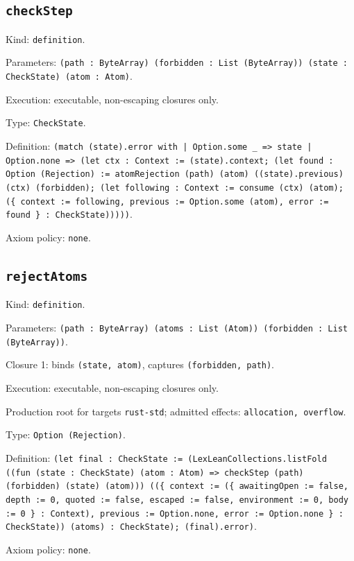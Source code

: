 \documentclass[11pt]{article}
\begin{document}
\subsection*{\texttt{checkStep}}
\noindent Kind: \texttt{definition}.\par
\noindent Parameters: \texttt{(path : ByteArray) (forbidden : List (ByteArray)) (state : CheckState) (atom : Atom)}.\par
\noindent Execution: executable, non-escaping closures only.\par
\noindent Type: \texttt{CheckState}.\par
\noindent Definition: \texttt{(match (state).error with | Option.some \_ => state | Option.none => (let ctx : Context := (state).context; (let found : Option (Rejection) := atomRejection (path) (atom) ((state).previous) (ctx) (forbidden); (let following : Context := consume (ctx) (atom); (\{ context := following, previous := Option.some (atom), error := found \} : CheckState)))))}.\par
\noindent Axiom policy: \texttt{none}.\par
\subsection*{\texttt{rejectAtoms}}
\noindent Kind: \texttt{definition}.\par
\noindent Parameters: \texttt{(path : ByteArray) (atoms : List (Atom)) (forbidden : List (ByteArray))}.\par
\noindent Closure 1: binds \texttt{(state, atom)}, captures \texttt{(forbidden, path)}.\par
\noindent Execution: executable, non-escaping closures only.\par
\noindent Production root for targets \texttt{rust-std}; admitted effects: \texttt{allocation, overflow}.\par
\noindent Type: \texttt{Option (Rejection)}.\par
\noindent Definition: \texttt{(let final : CheckState := (LexLeanCollections.listFold ((fun (state : CheckState) (atom : Atom) => checkStep (path) (forbidden) (state) (atom))) ((\{ context := (\{ awaitingOpen := false, depth := 0, quoted := false, escaped := false, environment := 0, body := 0 \} : Context), previous := Option.none, error := Option.none \} : CheckState)) (atoms) : CheckState); (final).error)}.\par
\noindent Axiom policy: \texttt{none}.\par
\end{document}
